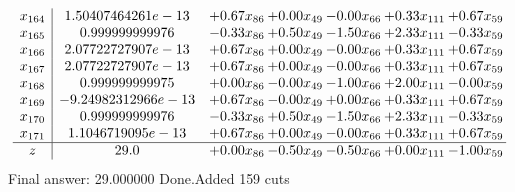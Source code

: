 \documentclass[8pt]{article}
\begin{document}
\[\begin{array}{c| c c@{\hskip 2pt} c@{\hskip 2pt} c@{\hskip 2pt} c@{\hskip 2pt} c@{\hskip 2pt} }
 x_{164}   &  1.50407464261e-13 & +  0.67 x_{86} & +  0.00 x_{49} & -0.00 x_{66} & +  0.33 x_{111} & +  0.67 x_{59}\\
 x_{165}   &  0.999999999976 & -0.33 x_{86} & +  0.50 x_{49} & -1.50 x_{66} & +  2.33 x_{111} & -0.33 x_{59}\\
 x_{166}   &  2.07722727907e-13 & +  0.67 x_{86} & +  0.00 x_{49} & -0.00 x_{66} & +  0.33 x_{111} & +  0.67 x_{59}\\
 x_{167}   &  2.07722727907e-13 & +  0.67 x_{86} & +  0.00 x_{49} & -0.00 x_{66} & +  0.33 x_{111} & +  0.67 x_{59}\\
 x_{168}   &  0.999999999975 & +  0.00 x_{86} & -0.00 x_{49} & -1.00 x_{66} & +  2.00 x_{111} & -0.00 x_{59}\\
 x_{169}   &  -9.24982312966e-13 & +  0.67 x_{86} & -0.00 x_{49} & +  0.00 x_{66} & +  0.33 x_{111} & +  0.67 x_{59}\\
 x_{170}   &  0.999999999976 & -0.33 x_{86} & +  0.50 x_{49} & -1.50 x_{66} & +  2.33 x_{111} & -0.33 x_{59}\\
 x_{171}   &  1.1046719095e-13 & +  0.67 x_{86} & +  0.00 x_{49} & -0.00 x_{66} & +  0.33 x_{111} & +  0.67 x_{59}\\
\hline
z    &  29.0 & +  0.00 x_{86} & -0.50 x_{49} & -0.50 x_{66} & +  0.00 x_{111} & -1.00 x_{59}\\
\end{array}\]
 Final answer: 29.000000 
Done.Added 159 cuts 
\end{document}
